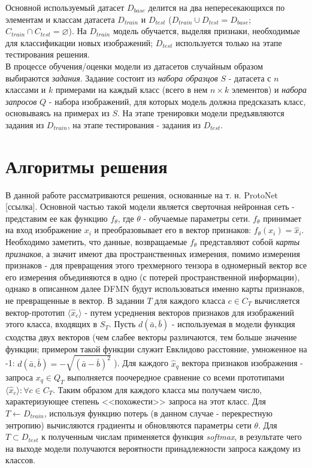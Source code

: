 \documentclass[a4paper, 12pt]{report}
\begin{document}
Основной используемый датасет $D_{base}$ делится на два непересекающихся по элементам и классам датасета $D_{train}$ и $D_{test}$ ($D_{train} \cup D_{test} = D_{base}$; $ C_{train} \cap C_{test} = \varnothing $). На $D_{train}$ модель обучается, выделяя признаки, необходимые для классификации новых изображений; $D_{test}$ используется только на этапе тестирования решения. \\

В процессе обучения/оценки модели из датасетов случайным образом выбираются \textit{задания}. Задание состоит из \textit{набора образцов} $S$ - датасета с $n$ классами и $k$ примерами на каждый класс (всего в нем $n \times k$ элементов) и \textit{набора запросов} $Q$ - набора изображений, для которых модель должна предсказать класс, основываясь на примерах из $S$. На этапе тренировки модели предъявляются задания из $D_{train}$, на этапе тестирования - задания из $D_{test}$.

\section {Алгоритмы решения}


В данной работе рассматриваются решения, основанные на т. н. ProtoNet [ссылка]. Основной частью такой модели является сверточная нейронная сеть - представим ее как функцию $f_{\theta}$, где $\theta$ - обучаемые параметры сети. $f_{\theta}$ принимает на вход изображение $x_i$ и преобразовывает его в вектор признаков: $f_{\theta}(x_i) = \hat{x}_i$. Необходимо заметить, что данные, возвращаемые $f_{\theta}$ представляют собой \textit{карты признаков}, а значит имеют два пространственных измерения, помимо измерения признаков - для превращения этого трехмерного тензора в одномерный вектор все его измерения объединяются в одно (с потерей пространственной информации), однако в описанном далее DFMN будут использоваться именно карты признаков, не превращенные в вектор.  В задании $T$ для каждого класса $c \in C_T$ вычисляется вектор-прототип $\langle  \hat{x}_c \rangle$ - путем усреднения векторов признаков для изображений этого класса, входящих в $S_T$. Пусть $d(\bar{a}, \bar{b})$ - используемая в модели функция сходства двух векторов (чем слабее векторы различаются, тем больше значение функции; примером такой функции служит Евклидово расстояние, умноженное на -1: $d(\bar{a}, \bar{b}) = -\sqrt{{(\bar{a} - \bar{b})}^2}$ ). Для каждого $ \hat{x}_q  $ вектора признаков изображения - запроса $x_q \in Q_T$ выполняется поочередное сравнение со всеми прототипами $\langle \hat{x}_c \rangle : \forall c \in C_T$. Таким образом для каждого класса мы получаем число, характеризующее степень <<похожести>> запроса на этот класс. Для $T \leftarrow D_{train}$, используя функцию потерь (в данном случае - перекрестную энтропию) вычисляются градиенты и обновляются параметры сети $\theta$. Для $T \subset D_{test}$ к полученным числам применяется функция \textit{softmax}, в результате чего на выходе модели получаются вероятности принадлежности запроса каждому из классов. \\
\end{document}
